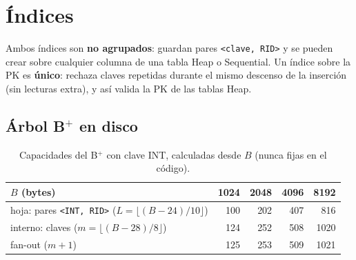 \documentclass[11pt,a4paper]{article}
\newcommand{\code}[1]{\texttt{#1}}
\begin{document}
\section{Índices}
\label{sec:indices}

Ambos índices son \textbf{no agrupados}: guardan pares \code{<clave, RID>} y se pueden crear sobre
cualquier columna de una tabla Heap o Sequential. Un índice sobre la PK es \textbf{único}: rechaza
claves repetidas durante el mismo descenso de la inserción (sin lecturas extra), y así valida la PK de
las tablas Heap.

\subsection{Árbol B$^+$ en disco}

\begin{table}[H]
\centering\small
\begin{tabular}{@{}lrrrr@{}}
\toprule
$B$ (bytes) & 1024 & 2048 & 4096 & 8192 \\
\midrule
hoja: pares \code{<INT, RID>} ($L=\lfloor (B-24)/10\rfloor$) & 100 & 202 & 407 & 816 \\
interno: claves ($m=\lfloor (B-28)/8\rfloor$) & 124 & 252 & 508 & 1020 \\
fan-out ($m+1$) & 125 & 253 & 509 & 1021 \\
\bottomrule
\end{tabular}
\caption{Capacidades del B$^+$ con clave INT, calculadas desde $B$ (nunca fijas en el código).}
\label{tab:bplus}
\end{table}
\end{document}
